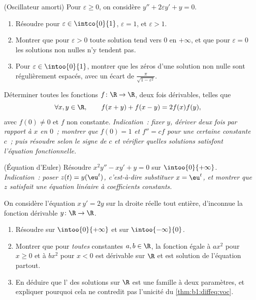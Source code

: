 \begin{exercise}[$\star\star\star$]\label{exo:b1:diffeq:9}
(Oscillateur amorti) Pour $\varepsilon \geq 0$, on considère
$y'' + 2\varepsilon y' + y = 0$.
\begin{enumerate}
  \item Résoudre pour $\varepsilon \in \intco{0}{1}$, $\varepsilon =
        1$, et $\varepsilon > 1$.
  \item Montrer que pour $\varepsilon > 0$ toute solution tend vers $0$
        en $+\infty$, et que pour $\varepsilon = 0$ les solutions non
        nulles n'y tendent pas.
  \item Pour $\varepsilon \in \intoo{0}{1}$, montrer que les zéros
        d'une solution non nulle sont régulièrement espacés, avec un
        écart de $\frac{\pi}{\sqrt{1 - \varepsilon^2}}$.
\end{enumerate}
\end{exercise}

\begin{exercise}[$\star\star\star$]\label{exo:b1:diffeq:10}
Déterminer toutes les fonctions $f \colon \R \to \R$, deux fois
dérivables, telles que
\[
\forall x, y \in \R, \qquad f(x + y) + f(x - y) = 2 f(x) f(y),
\]
avec $f(0) \ne 0$ et $f$ non constante.
\emph{Indication~: fixer $y$, dériver deux fois par rapport à $x$ en
$0$~; montrer que $f(0) = 1$ et $f'' = c f$ pour une certaine constante
$c$~; puis résoudre selon le signe de $c$ et vérifier quelles solutions
satisfont l'équation fonctionnelle.}
\end{exercise}

\begin{exercise}[$\star\star$]\label{exo:b1:diffeq:11}
(Équation d'Euler) Résoudre $x^2 y'' - x y' + y = 0$ sur
$\intoo{0}{+\infty}$. \emph{Indication~: poser $z(t) = y(\eu^t)$,
c'est-à-dire substituer $x = \eu^t$, et montrer que $z$ satisfait une
équation linéaire à coefficients constants.}
\end{exercise}

\begin{exercise}[$\star\star\star$]\label{exo:b1:diffeq:12}
On considère l'équation $x\,y' = 2y$ sur la droite réelle tout
entière, d'inconnue la fonction dérivable $y \colon \R \to \R$.
\begin{enumerate}
  \item Résoudre sur $\intoo{0}{+\infty}$ et sur $\intoo{-\infty}{0}$.
  \item Montrer que pour \emph{toutes} constantes $a, b \in \R$, la
        fonction égale à $ax^2$ pour $x \geq 0$ et à $bx^2$ pour
        $x < 0$ est dérivable sur $\R$ et est solution de l'équation
        partout.
  \item En déduire que l' des solutions sur $\R$ est une
        famille à deux paramètres, et expliquer pourquoi cela ne
        contredit pas l'unicité du \cref{thm:b1:diffeq:voc}.
\end{enumerate}
\end{exercise}

